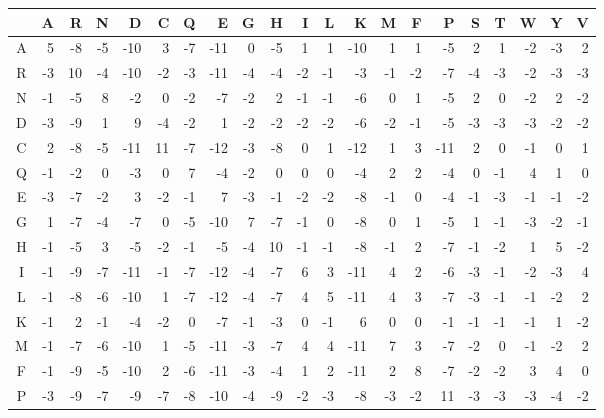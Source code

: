 \begin{mytable}
    \begin{tabular}{c|rrrrrrrrrrrrrrrrrrrr}
        & A  & R  & N  & D   & C  & Q  & E   & G  & H  & I  & L  & K   & M  & F  & P   & S  & T  & W  & Y  & V  \\
        \hline
        A & 5  & -8 & -5 & -10 & 3  & -7 & -11 & 0  & -5 & 1  & 1  & -10 & 1  & 1  & -5  & 2  & 1  & -2 & -3 & 2  \\
        R & -3 & 10 & -4 & -10 & -2 & -3 & -11 & -4 & -4 & -2 & -1 & -3  & -1 & -2 & -7  & -4 & -3 & -2 & -3 & -3 \\
        N & -1 & -5 & 8  & -2  & 0  & -2 & -7  & -2 & 2  & -1 & -1 & -6  & 0  & 1  & -5  & 2  & 0  & -2 & 2  & -2 \\
        D & -3 & -9 & 1  & 9   & -4 & -2 & 1   & -2 & -2 & -2 & -2 & -6  & -2 & -1 & -5  & -3 & -3 & -3 & -2 & -2 \\
        C & 2  & -8 & -5 & -11 & 11 & -7 & -12 & -3 & -8 & 0  & 1  & -12 & 1  & 3  & -11 & 2  & 0  & -1 & 0  & 1  \\
        Q & -1 & -2 & 0  & -3  & 0  & 7  & -4  & -2 & 0  & 0  & 0  & -4  & 2  & 2  & -4  & 0  & -1 & 4  & 1  & 0  \\
        E & -3 & -7 & -2 & 3   & -2 & -1 & 7   & -3 & -1 & -2 & -2 & -8  & -1 & 0  & -4  & -1 & -3 & -1 & -1 & -2 \\
        G & 1  & -7 & -4 & -7  & 0  & -5 & -10 & 7  & -7 & -1 & 0  & -8  & 0  & 1  & -5  & 1  & -1 & -3 & -2 & -1 \\
        H & -1 & -5 & 3  & -5  & -2 & -1 & -5  & -4 & 10 & -1 & -1 & -8  & -1 & 2  & -7  & -1 & -2 & 1  & 5  & -2 \\
        I & -1 & -9 & -7 & -11 & -1 & -7 & -12 & -4 & -7 & 6  & 3  & -11 & 4  & 2  & -6  & -3 & -1 & -2 & -3 & 4  \\
        L & -1 & -8 & -6 & -10 & 1  & -7 & -12 & -4 & -7 & 4  & 5  & -11 & 4  & 3  & -7  & -3 & -1 & -1 & -2 & 2  \\
        K & -1 & 2  & -1 & -4  & -2 & 0  & -7  & -1 & -3 & 0  & -1 & 6   & 0  & 0  & -1  & -1 & -1 & -1 & 1  & -2 \\
        M & -1 & -7 & -6 & -10 & 1  & -5 & -11 & -3 & -7 & 4  & 4  & -11 & 7  & 3  & -7  & -2 & 0  & -1 & -2 & 2  \\
        F & -1 & -9 & -5 & -10 & 2  & -6 & -11 & -3 & -4 & 1  & 2  & -11 & 2  & 8  & -7  & -2 & -2 & 3  & 4  & 0  \\
        P & -3 & -9 & -7 & -9  & -7 & -8 & -10 & -4 & -9 & -2 & -3 & -8  & -3 & -2 & 11  & -3 & -3 & -3 & -4 & -2 \\

\end{tabular}
\end{mytable}

